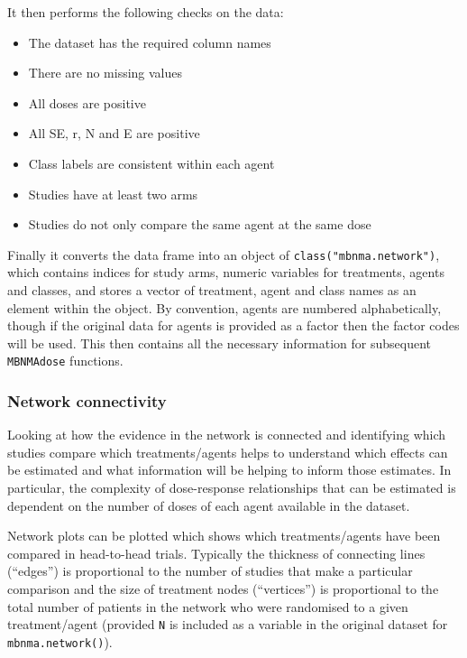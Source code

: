 \documentclass[]{article}
\providecommand{\tightlist}{%
  \setlength{\itemsep}{0pt}\setlength{\parskip}{0pt}}
\begin{document}
It then performs the following checks on the data:

\begin{itemize}
\tightlist
\item
  The dataset has the required column names
\item
  There are no missing values
\item
  All doses are positive
\item
  All SE, r, N and E are positive
\item
  Class labels are consistent within each agent
\item
  Studies have at least two arms
\item
  Studies do not only compare the same agent at the same dose
\end{itemize}

Finally it converts the data frame into an object of
\texttt{class("mbnma.network")}, which contains indices for study arms,
numeric variables for treatments, agents and classes, and stores a
vector of treatment, agent and class names as an element within the
object. By convention, agents are numbered alphabetically, though if the
original data for agents is provided as a factor then the factor codes
will be used. This then contains all the necessary information for
subsequent \texttt{MBNMAdose} functions.

\hypertarget{network-connectivity}{%
\subsubsection{Network connectivity}\label{network-connectivity}}

Looking at how the evidence in the network is connected and identifying
which studies compare which treatments/agents helps to understand which
effects can be estimated and what information will be helping to inform
those estimates. In particular, the complexity of dose-response
relationships that can be estimated is dependent on the number of doses
of each agent available in the dataset.

Network plots can be plotted which shows which treatments/agents have
been compared in head-to-head trials. Typically the thickness of
connecting lines (``edges'') is proportional to the number of studies
that make a particular comparison and the size of treatment nodes
(``vertices'') is proportional to the total number of patients in the
network who were randomised to a given treatment/agent (provided
\texttt{N} is included as a variable in the original dataset for
\texttt{mbnma.network()}).
\end{document}
